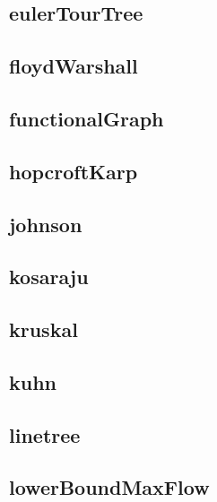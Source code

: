 \subsection{eulerTourTree}
\raggedbottom
\hrulefill
\subsection{floydWarshall}
\raggedbottom
\hrulefill
\subsection{functionalGraph}
\raggedbottom
\hrulefill
\subsection{hopcroftKarp}
\raggedbottom
\hrulefill
\subsection{johnson}
\raggedbottom
\hrulefill
\subsection{kosaraju}
\raggedbottom
\hrulefill
\subsection{kruskal}
\raggedbottom
\hrulefill
\subsection{kuhn}
\raggedbottom
\hrulefill
\subsection{linetree}
\raggedbottom
\hrulefill
\subsection{lowerBoundMaxFlow}
\raggedbottom
\hrulefill

